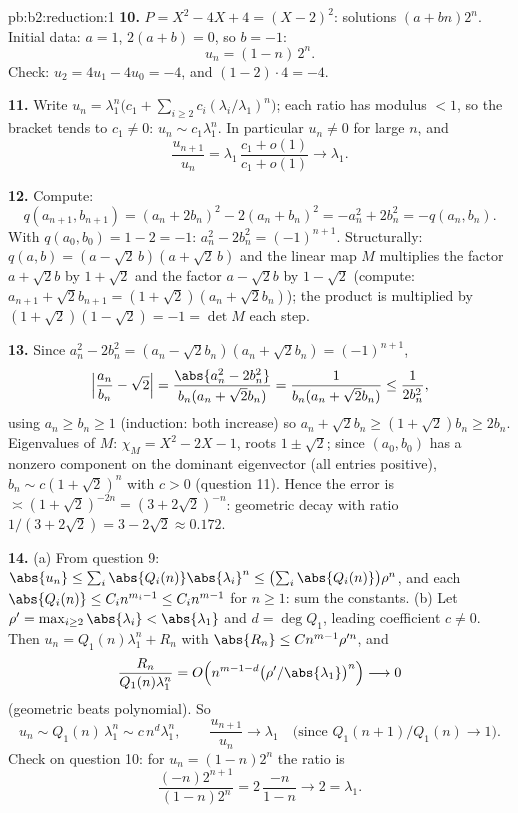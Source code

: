 \begin{solution}{pb:b2:reduction:1}
\textbf{10.} $P = X^2 - 4X + 4 = (X - 2)^2$: solutions $(a +
bn)2^n$. Initial data: $a = 1$, $2(a + b) = 0$, so $b = -1$:
\[
u_n = (1 - n)\,2^n .
\]
Check: $u_2 = 4u_1 - 4u_0 = -4$, and $(1 - 2)\cdot4 = -4$.

\textbf{11.} Write $u_n = \lambda_1^n\bigl(c_1 + \sum_{i\geq2}
c_i(\lambda_i/\lambda_1)^n\bigr)$; each ratio has modulus $< 1$,
so the bracket tends to $c_1 \neq 0$: $u_n \sim c_1\lambda_1^n$.
In particular $u_n \neq 0$ for large $n$, and
\[
\frac{u_{n+1}}{u_n} =
\lambda_1\,\frac{c_1 + o(1)}{c_1 + o(1)} \longrightarrow
\lambda_1 .
\]

\textbf{12.} Compute:
\[
q(a_{n+1}, b_{n+1}) = (a_n + 2b_n)^2 - 2(a_n + b_n)^2
= -a_n^2 + 2b_n^2 = -q(a_n, b_n).
\]
With $q(a_0, b_0) = 1 - 2 = -1$: $a_n^2 - 2b_n^2 = (-1)^{n+1}$.
Structurally: $q(a, b) = (a - \sqrt2\,b)(a + \sqrt2\,b)$ and
the linear map $M$ multiplies the factor $a + \sqrt2 b$ by $1 +
\sqrt2$ and the factor $a - \sqrt2 b$ by $1 - \sqrt2$ (compute:
$a_{n+1} + \sqrt2 b_{n+1} = (1 + \sqrt2)(a_n + \sqrt2 b_n)$);
the product is multiplied by $(1 + \sqrt2)(1 - \sqrt2) = -1 =
\det M$ each step.

\textbf{13.} Since $a_n^2 - 2b_n^2 = (a_n - \sqrt2 b_n)(a_n +
\sqrt2 b_n) = (-1)^{n+1}$,
\[
\Bigl|\frac{a_n}{b_n} - \sqrt2\Bigr|
= \frac{\abs{a_n^2 - 2b_n^2}}{b_n(a_n + \sqrt2 b_n)}
= \frac{1}{b_n(a_n + \sqrt2 b_n)} \leq \frac1{2b_n^2},
\]
using $a_n \geq b_n \geq 1$ (induction: both increase) so $a_n +
\sqrt2 b_n \geq (1 + \sqrt2)b_n \geq 2b_n$. Eigenvalues of $M$:
$\chi_M = X^2 - 2X - 1$, roots $1 \pm \sqrt2$; since $(a_0, b_0)$
has a nonzero component on the dominant eigenvector (all entries
positive), $b_n \sim c(1 + \sqrt2)^n$ with $c > 0$ (question
11). Hence the error is $\asymp (1 + \sqrt2)^{-2n} = (3 +
2\sqrt2)^{-n}$: geometric decay with ratio $1/(3 + 2\sqrt2) = 3
- 2\sqrt2 \approx 0.172$.

\textbf{14.} (a) From question 9: $\abs{u_n} \leq \sum_i
\abs{Q_i(n)}\abs{\lambda_i}^n \leq \bigl(\sum_i
\abs{Q_i(n)}\bigr)\rho^n$, and each $\abs{Q_i(n)} \leq C_i
n^{m_i - 1} \leq C_i n^{m-1}$ for $n \geq 1$: sum the constants.
(b) Let $\rho' = \max_{i \geq 2}\abs{\lambda_i} <
\abs{\lambda_1}$ and $d = \deg Q_1$, leading coefficient $c
\neq 0$. Then $u_n = Q_1(n)\lambda_1^n + R_n$ with $\abs{R_n}
\leq Cn^{m-1}\rho'^n$, and
\[
\frac{R_n}{Q_1(n)\lambda_1^n} = O\Bigl(n^{m-1-d}
\bigl(\rho'/\abs{\lambda_1}\bigr)^n\Bigr) \longrightarrow 0
\]
(geometric beats polynomial). So
\[
u_n \sim Q_1(n)\,\lambda_1^n \sim c\,n^d\lambda_1^n,
\qquad
\frac{u_{n+1}}{u_n} \longrightarrow \lambda_1
\quad\text{(since } Q_1(n{+}1)/Q_1(n) \to 1\text{)}.
\]
Check on question 10: for $u_n = (1-n)2^n$ the ratio is
\[
\frac{(-n)2^{n+1}}{(1-n)2^n} = 2\,\frac{-n}{1-n}
\longrightarrow 2 = \lambda_1 .
\]


\end{solution}
